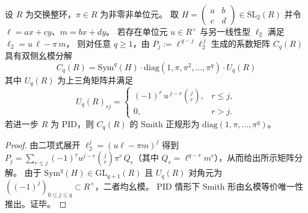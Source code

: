 \begin{proposition}\label{prop:xi-smith-staircase-template-symq}
设 \(R\) 为交换整环，\(\pi\in R\) 为非零非单位元。
取
\(
H=\begin{pmatrix}a&b\\ c&d\end{pmatrix}\in\mathrm{SL}_2(R)
\)
并令 \(\ell=ax+cy\)、\(m=bx+dy\)。
若存在单位元 \(u\in R^\times\) 与另一线性型 \(\ell_2\) 满足
\(
\ell_2=u\,\ell-\pi\,m
\)，
则对任意 \(q\ge 1\)，由
\(
P_j:=\ell^{\,q-j}\ell_2^{\,j}
\)
生成的系数矩阵 \(C_q(R)\) 具有双侧幺模分解
\[
\boxed{\;
C_q(R)=\mathrm{Sym}^q(H)\cdot \mathrm{diag}(1,\pi,\pi^2,\dots,\pi^q)\cdot U_q(R)\;}
\]
其中 \(U_q(R)\) 为上三角矩阵并满足
\[
U_q(R)_{rj}=
\begin{cases}
(-1)^r\,u^{\,j-r}\binom{j}{r},& r\le j,\\
0,& r>j.
\end{cases}
\]
若进一步 \(R\) 为 PID，则 \(C_q(R)\) 的 Smith 正规形为 \(\mathrm{diag}(1,\pi,\dots,\pi^q)\)。
\end{proposition}
\begin{proof}
由二项式展开
\(
\ell_2^{j}=(u\ell-\pi m)^{j}
\)
得到 \(P_j=\sum_{r\le j}(-1)^r u^{j-r}\binom{j}{r}\pi^r\,Q_r\)（其中 \(Q_r=\ell^{q-r}m^r\)），从而给出所示矩阵分解。
由于 \(\mathrm{Sym}^q(H)\in\mathrm{GL}_{q+1}(R)\) 且 \(U_q(R)\) 对角元为 \(((-1)^j)_{0\le j\le q}\subset R^\times\)，二者均幺模。
PID 情形下 Smith 形由幺模等价唯一性推出。证毕。
\end{proof}





\endinput
